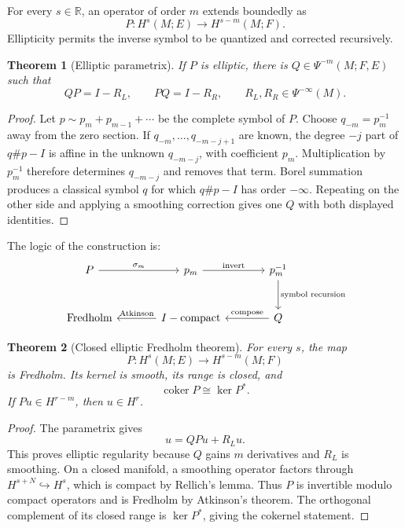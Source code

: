\documentclass[12pt,oneside,reqno]{article}
\theoremstyle{plain}
\newtheorem{theorem}{Theorem}[section]
\theoremstyle{definition}
\theoremstyle{remark}
\begin{document}
For every \(s\in\mathbb R\), an operator of order \(m\) extends boundedly
as
\[
 P:H^s(M;E)\longrightarrow H^{s-m}(M;F).
\]
Ellipticity permits the inverse symbol to be quantized and corrected
recursively.

\begin{theorem}[Elliptic parametrix]
If \(P\) is elliptic, there is \(Q\in\Psi^{-m}(M;F,E)\) such that
\[
 QP=I-R_L,\qquad PQ=I-R_R,
 \qquad R_L,R_R\in\Psi^{-\infty}(M).
\]
\end{theorem}

\begin{proof}
Let \(p\sim p_m+p_{m-1}+\cdots\) be the complete symbol of \(P\).
Choose \(q_{-m}=p_m^{-1}\) away from the zero section. If
\(q_{-m},\ldots,q_{-m-j+1}\) are known, the degree \(-j\) part of
\(q\# p-I\) is affine in the unknown \(q_{-m-j}\), with coefficient
\(p_m\). Multiplication by \(p_m^{-1}\) therefore determines
\(q_{-m-j}\) and removes that term. Borel summation produces a classical
symbol \(q\) for which \(q\# p-I\) has order \(-\infty\). Repeating on
the other side and applying a smoothing correction gives one \(Q\) with
both displayed identities.
\end{proof}

The logic of the construction is:
\[
\begin{tikzcd}[column sep=large,row sep=large]
 P
 \arrow[r,"\sigma_m"]
 &p_m
 \arrow[r,"\text{invert}"]
 &p_m^{-1}
 \arrow[d,"\text{symbol recursion}"]\\
 \text{Fredholm}
 &I-\text{compact}\arrow[l,"\text{Atkinson}"']
 &Q\arrow[l,"\text{compose}"']
\end{tikzcd}
\]

\begin{theorem}[Closed elliptic Fredholm theorem]
For every \(s\), the map
\[
 P:H^s(M;E)\longrightarrow H^{s-m}(M;F)
\]
is Fredholm. Its kernel is smooth, its range is closed, and
\[
 \operatorname{coker}P\cong\ker P^*.
\]
If \(Pu\in H^{r-m}\), then \(u\in H^r\).
\end{theorem}

\begin{proof}
The parametrix gives
\[
 u=QPu+R_Lu.
\]
This proves elliptic regularity because \(Q\) gains \(m\) derivatives and
\(R_L\) is smoothing. On a closed manifold, a smoothing operator factors
through \(H^{s+N}\hookrightarrow H^s\), which is compact by Rellich's
lemma. Thus \(P\) is invertible modulo compact operators and is Fredholm
by Atkinson's theorem. The orthogonal complement of its closed range is
\(\ker P^*\), giving the cokernel statement.
\end{proof}
\end{document}
